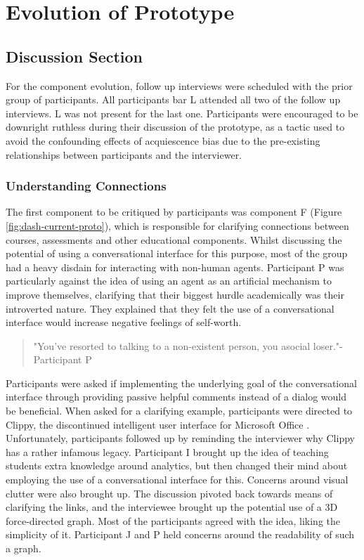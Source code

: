\documentclass{l4proj}
\begin{document}
\chapter{Evolution of Prototype}

\section{Discussion Section}

For the component evolution, follow up interviews were scheduled with the prior group of participants. All participants bar L attended all two of the follow up interviews. L was not present for the last one. Participants were encouraged to be downright ruthless during their discussion of the prototype, as a tactic used to avoid the confounding effects of acquiescence bias due to the pre-existing relationships between participants and the interviewer.

\subsection{Understanding Connections}
The first component to be critiqued by participants was component F (Figure \ref{fig:dash-current-proto}), which is responsible for clarifying connections between courses, assessments and other educational components. Whilst discussing the potential of using a conversational interface for this purpose, most of the group had a heavy disdain for interacting with non-human agents. Participant P was particularly against the idea of using an agent as an artificial mechanism to improve themselves, clarifying that their biggest hurdle academically was their introverted nature. They explained that they felt the use of a conversational interface would increase negative feelings of self-worth.

\begin{quote}
    "You've resorted to talking to a non-existent person, you asocial loser."-Participant P
\end{quote}

Participants were asked if implementing the underlying goal of the conversational interface through providing passive helpful comments instead of a dialog would be beneficial. When asked for a clarifying example, participants were directed to Clippy, the discontinued intelligent user interface for Microsoft Office \citep{Cassidy_2022}. Unfortunately, participants followed up by reminding the interviewer why Clippy has a rather infamous legacy. Participant I brought up the idea of teaching students extra knowledge around analytics, but then changed their mind about employing the use of a conversational interface for this. Concerns around visual clutter were also brought up. The discussion pivoted back towards means of clarifying the links, and the interviewee brought up the potential use of a 3D force-directed graph. Most of the participants agreed with the idea, liking the simplicity of it. Participant J and P held concerns around the readability of such a graph.
\end{document}
